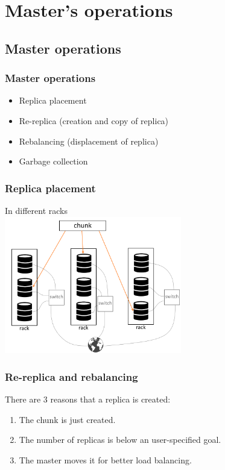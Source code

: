 \documentclass{beamer}
\begin{document}
\section{Master's operations}
\subsection{Master operations}

\begin{frame}
 \frametitle{Master operations}
 \begin{itemize}
  \item \alert{Replica placement}
  \item \alert{Re-replica} (creation and copy of replica)
  \item \alert{Rebalancing} (displacement of replica)
  \item \alert{Garbage collection}
 \end{itemize}
\end{frame}

\begin{frame}
 \frametitle{Replica placement}
 In different racks\\\vspace{0.3cm}
 \centering
 \includegraphics[height=6cm]{figures/racksschema.png}
\end{frame}

\begin{frame}
 \frametitle{Re-replica and rebalancing}
 There are 3 reasons that a replica is created:
 \begin{enumerate}
  \item The chunk is just created.
  \item The number of replicas is below an user-specified goal.
  \item The master moves it for better load balancing.
 \end{enumerate}
\end{frame}
\end{document}
